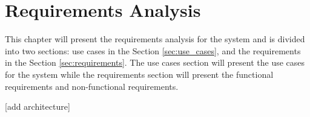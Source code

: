 \chapter{Requirements Analysis}
\label{ch:requirements_analysis}

This chapter will present the requirements analysis for the system and is divided into two sections: use cases in the Section \ref{sec:use_cases}, and the requirements in the Section \ref{sec:requirements}.
The use cases section will present the use cases for the system while the requirements section will present the functional requirements and non-functional requirements.

    [add architecture]




